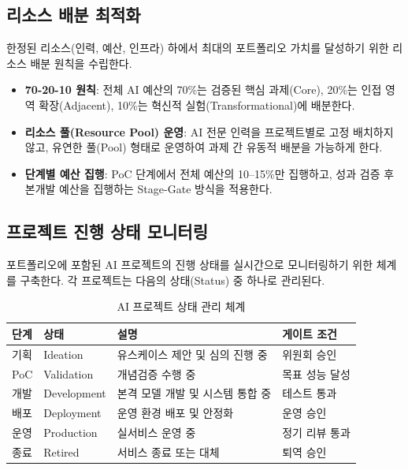 \subsection{리소스 배분 최적화}
\label{sec:8.5.3}

한정된 리소스(인력, 예산, 인프라) 하에서 최대의 포트폴리오 가치를 달성하기 위한 리소스 배분 원칙을 수립한다.

\begin{itemize}
    \item \textbf{70-20-10 원칙}: 전체 AI 예산의 70\%는 검증된 핵심 과제(Core), 20\%는 인접 영역 확장(Adjacent), 10\%는 혁신적 실험(Transformational)에 배분한다.
    \item \textbf{리소스 풀(Resource Pool) 운영}: AI 전문 인력을 프로젝트별로 고정 배치하지 않고, 유연한 풀(Pool) 형태로 운영하여 과제 간 유동적 배분을 가능하게 한다.
    \item \textbf{단계별 예산 집행}: PoC 단계에서 전체 예산의 10--15\%만 집행하고, 성과 검증 후 본개발 예산을 집행하는 Stage-Gate 방식을 적용한다.
\end{itemize}

\subsection{프로젝트 진행 상태 모니터링}
\label{sec:8.5.4}

포트폴리오에 포함된 AI 프로젝트의 진행 상태를 실시간으로 모니터링하기 위한 체계를 구축한다. 각 프로젝트는 다음의 상태(Status) 중 하나로 관리된다.

\begin{table}[htbp]
\centering
\caption{AI 프로젝트 상태 관리 체계}
\label{tab:project_status}
\begin{tabularx}{\textwidth}{p{2.5cm}p{2cm}Xp{2.5cm}}
\toprule
\textbf{단계} & \textbf{상태} & \textbf{설명} & \textbf{게이트 조건} \\
\midrule
기획 & Ideation & 유스케이스 제안 및 심의 진행 중 & 위원회 승인 \\
PoC & Validation & 개념검증 수행 중 & 목표 성능 달성 \\
개발 & Development & 본격 모델 개발 및 시스템 통합 중 & 테스트 통과 \\
배포 & Deployment & 운영 환경 배포 및 안정화 & 운영 승인 \\
운영 & Production & 실서비스 운영 중 & 정기 리뷰 통과 \\
종료 & Retired & 서비스 종료 또는 대체 & 퇴역 승인 \\
\bottomrule
\end{tabularx}
\end{table}

